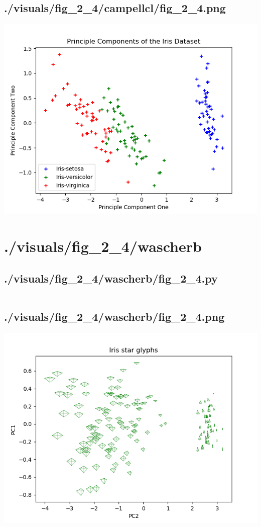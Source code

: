 \documentclass{report}
\begin{document}
    \subsection{./visuals/fig\_2\_4/campellcl/fig\_2\_4.png}
    \includegraphics[width=\textwidth]{.././visuals/fig_2_4/campellcl/fig_2_4.png}
    \pagebreak
    \section{./visuals/fig\_2\_4/wascherb}
    \subsection{./visuals/fig\_2\_4/wascherb/fig\_2\_4.py}
    \inputminted[breaklines=true]{python}{.././visuals/fig_2_4/wascherb/fig_2_4.py}
    \subsection{./visuals/fig\_2\_4/wascherb/fig\_2\_4.png}
    \includegraphics[width=\textwidth]{.././visuals/fig_2_4/wascherb/fig_2_4.png}
    \pagebreak
\end{document}
